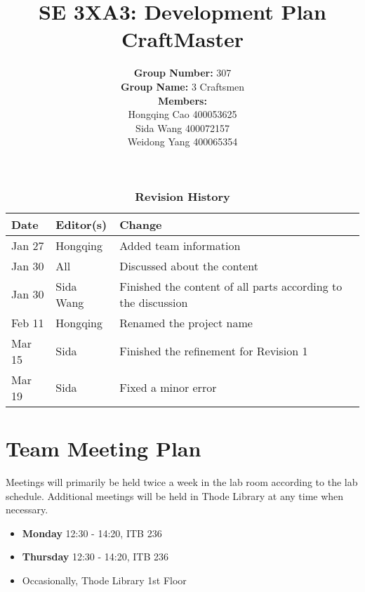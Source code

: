 \documentclass{article}
\begin{document}
\title{\textbf{SE 3XA3: Development Plan\\CraftMaster}}

\author{\textbf{Group Number: }307\\
		\textbf{Group Name: }3 Craftsmen \\
		\textbf{Members: }\\
		Hongqing Cao 400053625\\
		Sida Wang	 400072157\\
		Weidong Yang 400065354}

\date{}

\maketitle
\thispagestyle{empty}
\newpage


\tableofcontents
\listoftables
\listoffigures
\newpage
\FloatBarrier
\begin{table}
\begin{tabularx}{\textwidth}{llX}
\toprule
\textbf{Date} & \textbf{Editor(s)} & \textbf{Change}\\
\midrule
Jan 27 & Hongqing & Added team information\\
Jan 30 & All & Discussed about the content\\
Jan 30 & Sida Wang & Finished the content of all parts according to the discussion\\
Feb 11 & Hongqing & Renamed the project name \\
Mar 15 & Sida & Finished the refinement for Revision 1\\
Mar 19 & Sida & Fixed a minor error\\
\bottomrule
\end{tabularx}
\caption{\textbf{Revision History}} \label{TblRevisionHistory}
\end{table}
\FloatBarrier
\newpage
{}
\section{Team Meeting Plan}
Meetings will primarily be held twice a week in the lab room according to the lab schedule. Additional meetings will be held in Thode Library at any time when necessary.

\begin{itemize}
	\item \textbf{Monday} 12:30 - 14:20,    ITB 236
	\item \textbf{Thursday} 12:30 - 14:20,    ITB 236
	\item Occasionally,    Thode Library 1st Floor
\end{itemize}
\end{document}
